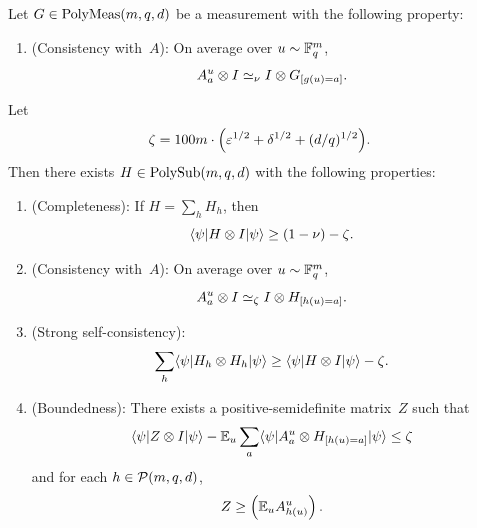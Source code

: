 \begin{lemma}\label{lem:self-improvement-helper}
  \leanok
  Let $G \in \mathrm{PolyMeas}(m,q,d)$ be a measurement with the following property:
  \begin{enumerate}
    \item (Consistency with~$A$): \label{item:self-improvement-G-consistency} On average over $u \sim \mathbb{F}_q^{m}$,
    \[
      A^{u}_a \otimes I \simeq_{\nu} I \otimes G_{[g(u)=a]}.
    \]
  \end{enumerate}
  Let
  \[
    \zeta = 100m\cdot \Big(\varepsilon^{1/2} + \delta^{1/2} + (d/q)^{1/2}\Big).
  \]
  Then there exists $H \in \mathrm{PolySub}(m,q,d)$ with the following properties:
  \begin{enumerate}
    \item (Completeness): \label{item:self-improvement-completeness} If $H = \sum_h H_h$, then
    \[
      \langle \psi \rvert H \otimes I \lvert \psi \rangle \geq (1-\nu)-\zeta.
    \]
    \item (Consistency with~$A$): \label{item:self-improvement-A-consistency} On average over $u \sim \mathbb{F}_q^m$,
    \[
      A^u_a \otimes I \simeq_{\zeta} I \otimes H_{[h(u) = a]}.
    \]
    \item (Strong self-consistency): \label{item:self-improvement-self}
    \[
      \sum_{h} \langle \psi \rvert H_h \otimes H_h \lvert \psi \rangle \geq \langle \psi \rvert H \otimes I \lvert \psi \rangle - \zeta.
    \]
    \item (Boundedness): \label{item:self-improvement-boundedness} There exists a positive-semidefinite matrix~$Z$ such that
    \[
      \langle \psi \rvert Z \otimes I \lvert \psi \rangle -\mathbb{E}_{u} \sum_a \langle \psi \rvert  A^{u}_{a} \otimes H_{[h(u)=a]} \lvert \psi \rangle \leq \zeta
    \]
    and for each $h \in \mathcal{P}(m,q,d)$,
    \[
      Z \geq \left(\mathbb{E}_{u} A^{u}_{h(u)}\right).
    \]
  \end{enumerate}
\end{lemma}
